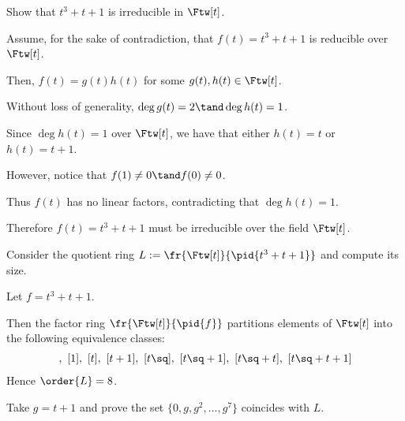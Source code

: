 \documentclass{article}
\begin{document}

\setcounter{section}{3}
\setcounter{exercise}{1}
\begin{subexercise}
Show that $ t^3+t+1 $ is irreducible in $ \Ftw[t] $.
\end{subexercise}

\begin{solution}
Assume, for the sake of contradiction, that $ f(t) = t^3+t+1 $ is reducible over $ \Ftw[t] $.

Then, $ f(t) = g(t)h(t) $ for some $ g(t),h(t)\in \Ftw[t] $.

Without loss of generality, $ \deg g(t) = 2 \tand \deg h(t) = 1 $.

Since $ \deg h(t) = 1 $ over $ \Ftw[t] $, we have that either $ h(t) = t $ or $ h(t) = t+1 $.

However, notice that $ f(1) \neq 0\tand f(0)\neq 0 $.

Thus $ f(t) $ has no linear factors, contradicting that $ \deg h(t) = 1 $.

Therefore $ f(t) = t^3+t+1 $ must be irreducible over the field $ \Ftw[t] $.
\end{solution}

\begin{subexercise}
Consider the quotient ring $ L:= \fr{\Ftw[t]}{\pid{t^3+t+1}} $ and compute its size.
\end{subexercise}

\begin{solution}
Let $ f = t^3+t+1 $.

Then the factor ring $ \fr{\Ftw[t]}{\pid{f}} $ partitions elements of $ \Ftw[t] $ into the following equivalence classes: \begin{align*}
  [0],\ [1],\ [t] ,\ [t+1],\ [t\sq],\ [t\sq+1],\ [t\sq+t],\ [t\sq+t+1]
\end{align*}
Hence $ \order{L} = 8 $.
\end{solution}

\begin{subexercise}
Take $ g=t+1 $ and prove the set $ \{0,g,g^2,\ldots,g^7\} $ coincides with $ L $.
\end{subexercise}
\end{document}
